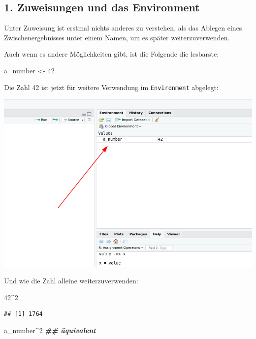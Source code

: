 \documentclass[
]{book}
\newenvironment{Shaded}{\begin{snugshade}}{\end{snugshade}}
\newcommand{\DecValTok}[1]{\textcolor[rgb]{0.00,0.00,0.81}{#1}}
\newcommand{\DocumentationTok}[1]{\textcolor[rgb]{0.56,0.35,0.01}{\textbf{\textit{#1}}}}
\newcommand{\NormalTok}[1]{#1}
\newcommand{\OtherTok}[1]{\textcolor[rgb]{0.56,0.35,0.01}{#1}}
\newcommand{\SpecialCharTok}[1]{\textcolor[rgb]{0.00,0.00,0.00}{#1}}
\begin{document}
\hypertarget{zuweisungen-und-das-environment}{%
\subsection{1. Zuweisungen und das Environment}\label{zuweisungen-und-das-environment}}

Unter Zuweisung ist erstmal nichts anderes zu verstehen, als das Ablegen eines Zwischenergebnisses unter einem Namen, um es später weiterzuverwenden.

Auch wenn es andere Möglichkeiten gibt, ist die Folgende die lesbarste:

\begin{Shaded}
\begin{Highlighting}[]
\NormalTok{a\_number }\OtherTok{\textless{}{-}} \DecValTok{42}
\end{Highlighting}
\end{Shaded}

Die Zahl 42 ist jetzt für weitere Verwendung im \texttt{Environment} abgelegt:

\begin{center}\includegraphics[width=0.6\linewidth]{imgs/environment} \end{center}

Und wie die Zahl alleine weiterzuverwenden:

\begin{Shaded}
\begin{Highlighting}[]
\DecValTok{42}\SpecialCharTok{\^{}}\DecValTok{2}
\end{Highlighting}
\end{Shaded}

\begin{verbatim}
## [1] 1764
\end{verbatim}

\begin{Shaded}
\begin{Highlighting}[]
\NormalTok{a\_number}\SpecialCharTok{\^{}}\DecValTok{2} \DocumentationTok{\#\# äquivalent}
\end{Highlighting}
\end{Shaded}
\end{document}

